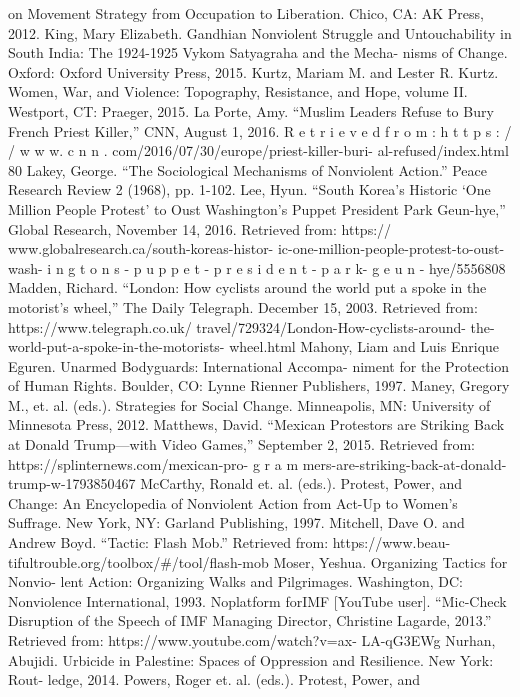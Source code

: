 \documentclass[twoside,a4paper,12pt,fleqn,openany]{extbook}
\begin{document}
on Movement Strategy from Occupation to
Liberation. Chico, CA: AK Press, 2012.
King, Mary Elizabeth. Gandhian Nonviolent
Struggle and Untouchability in South India: The
1924-1925 Vykom Satyagraha and the Mecha-
nisms of Change. Oxford: Oxford University
Press, 2015.
Kurtz, Mariam M. and Lester R. Kurtz. Women,
War, and Violence: Topography, Resistance, and
Hope, volume II. Westport, CT: Praeger, 2015.
La Porte, Amy. “Muslim Leaders Refuse to Bury
French Priest Killer,” CNN, August 1, 2016.
R e t r i e v e d f r o m : h t t p s : / / w w w. c n n .
com/2016/07/30/europe/priest-killer-buri-
al-refused/index.html
80
Lakey, George. “The Sociological Mechanisms
of Nonviolent Action.” Peace Research Review
2 (1968), pp. 1-102.
Lee, Hyun. “South Korea’s Historic ‘One Million
People Protest’ to Oust Washington’s Puppet
President Park Geun-hye,” Global Research,
November 14, 2016. Retrieved from: https://
www.globalresearch.ca/south-koreas-histor-
ic-one-million-people-protest-to-oust-wash-
i n g t o n s - p u p p e t - p r e s i d e n t - p a r k- g e u n -
hye/5556808
Madden, Richard. “London: How cyclists around
the world put a spoke in the motorist’s wheel,”
The Daily Telegraph. December 15, 2003.
Retrieved from: https://www.telegraph.co.uk/
travel/729324/London-How-cyclists-around-
the-world-put-a-spoke-in-the-motorists-
wheel.html
Mahony, Liam and Luis Enrique Eguren.
Unarmed Bodyguards: International Accompa-
niment for the Protection of Human Rights.
Boulder, CO: Lynne Rienner Publishers, 1997.
Maney, Gregory M., et. al. (eds.). Strategies for
Social Change. Minneapolis, MN: University of
Minnesota Press, 2012.
Matthews, David. “Mexican Protestors are
Striking Back at Donald Trump—with Video
Games,” September 2, 2015. Retrieved from:
https://splinternews.com/mexican-pro-
g r a m mers-are-striking-back-at-donald-
trump-w-1793850467
McCarthy, Ronald et. al. (eds.). Protest, Power,
and Change: An Encyclopedia of Nonviolent
Action from Act-Up to Women’s Suffrage. New
York, NY: Garland Publishing, 1997.
Mitchell, Dave O. and Andrew Boyd. “Tactic:
Flash Mob.” Retrieved from: https://www.beau-
tifultrouble.org/toolbox/#/tool/flash-mob
Moser, Yeshua. Organizing Tactics for Nonvio-
lent Action: Organizing Walks and Pilgrimages.
Washington, DC: Nonviolence International,
1993.
Noplatform forIMF [YouTube user]. “Mic-Check
Disruption of the Speech of IMF Managing
Director, Christine Lagarde, 2013.” Retrieved
from: https://www.youtube.com/watch?v=ax-
LA-qG3EWg
Nurhan, Abujidi. Urbicide in Palestine: Spaces
of Oppression and Resilience. New York: Rout-
ledge, 2014.
Powers, Roger et. al. (eds.). Protest, Power, and
\end{document}
